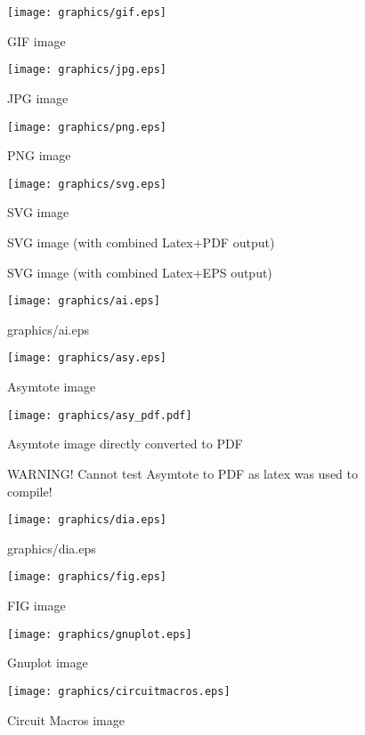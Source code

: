 \documentclass{scrartcl}
\begin{document}
\glsaddall
\begin{figure}
\texttt{[image: graphics/gif.eps]}
\caption{GIF image}
\end{figure}
\begin{figure}
\texttt{[image: graphics/jpg.eps]}
\caption{JPG image}
\end{figure}
\begin{figure}
\texttt{[image: graphics/png.eps]}
\caption{PNG image}
\end{figure}
\begin{figure}
\texttt{[image: graphics/svg.eps]}
\caption{SVG image}
\end{figure}
%
\begin{figure}
\ifpdf
	
	\caption{SVG image (with combined Latex+PDF output)}
\else
		
	\caption{SVG image (with combined Latex+EPS output)}
\fi
\end{figure}
%
\begin{figure}
\texttt{[image: graphics/ai.eps]}
\caption{graphics/ai.eps}
\end{figure}
\begin{figure}
\texttt{[image: graphics/asy.eps]}
\caption{Asymtote image}
\end{figure}
%
\begin{figure}
\ifpdf
	\texttt{[image: graphics/asy\_pdf.pdf]}
	\caption{Asymtote image directly converted to PDF}
\else
	\caption{WARNING! Cannot test Asymtote to PDF as latex was used to compile!}
\fi
\end{figure}
%
\begin{figure}
\texttt{[image: graphics/dia.eps]}
\caption{graphics/dia.eps}
\end{figure}
\begin{figure}
\texttt{[image: graphics/fig.eps]}
\caption{FIG image}
\end{figure}
\begin{figure}
\texttt{[image: graphics/gnuplot.eps]}
\caption{Gnuplot image}
\end{figure}
\begin{figure}
\texttt{[image: graphics/circuitmacros.eps]}
\caption{Circuit Macros image}
\end{figure}
\clearpage
\printglossaries
\end{document}
